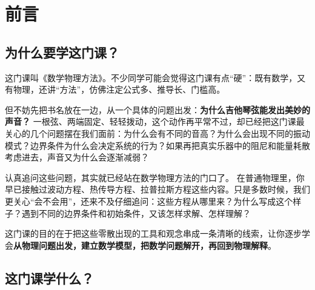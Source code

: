 \chapter*{前言}

\section*{为什么要学这门课？}

这门课叫《数学物理方法》。不少同学可能会觉得这门课有点``硬''：既有数学，又有物理，还讲``方法''，仿佛注定公式多、推导长、门槛高。

但不妨先把书名放在一边，从一个具体的问题出发：\textbf{为什么吉他琴弦能发出美妙的声音？}
一根弦、两端固定、轻轻拨动，这个动作再平常不过，却已经把这门课最关心的几个问题摆在我们面前：为什么会有不同的音高？为什么会出现不同的振动模式？边界条件为什么会决定系统的行为？如果再把真实乐器中的阻尼和能量耗散考虑进去，声音又为什么会逐渐减弱？

认真追问这些问题，其实就已经站在数学物理方法的门口了。
在普通物理里，你早已接触过波动方程、热传导方程、拉普拉斯方程这些内容。只是多数时候，我们更关心``会不会用''，还来不及仔细追问：这些方程从哪里来？为什么写成这个样子？遇到不同的边界条件和初始条件，又该怎样求解、怎样理解？

这门课的目的在于把这些零散出现的工具和观念串成一条清晰的线索，让你逐步学会\textbf{从物理问题出发，建立数学模型，把数学问题解开，再回到物理解释}。

\section*{这门课学什么？}

